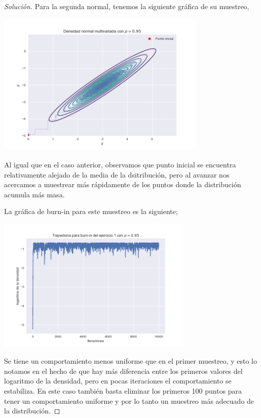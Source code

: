 \documentclass{article}
\begin{document}
\begin{enumerate}
\begin{proof}[Solución]
        Para la segunda normal, tenemos la siguiente gráfica de su muestreo,

        \begin{center}
            \includegraphics[width=0.75\textwidth]{Tarea8/traj12.png}
        \end{center}

        Al igual que en el caso anterior, observamos que punto inicial se encuentra
        relativamente alejado de la media de la dsitribución, pero al avanzar nos acercamos a
        muestrear más rápidamente de los puntos donde la distribución acumula más masa.

        La gráfica de burn-in para este muestreo es la siguiente;

        \begin{center}
            \includegraphics[width=0.7\textwidth]{Tarea8/burnin2.png}
        \end{center}

        Se tiene un comportamiento menos uniforme que en el primer muestreo, y esto lo notamos
        en el hecho de que hay más diferencia entre los primeros valores del logaritmo
        de la densidad, pero en pocas iteraciones el comportamiento se estabiliza. En este
        caso también basta eliminar los primeros 100 puntos para tener un comportamiento
        uniforme y por lo tanto un muestreo más adecuado de la distribución.


\end{proof}
\end{enumerate}
\end{document}
